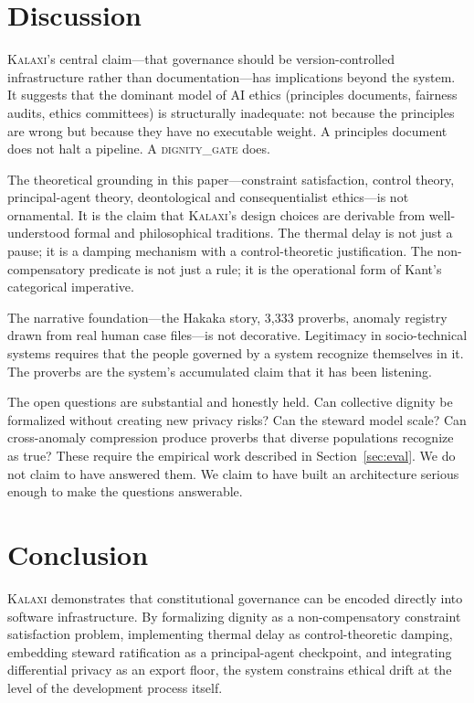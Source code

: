 \documentclass[12pt,a4paper]{article}
\theoremstyle{definition}
\theoremstyle{remark}
\newcommand{\dignitygate}{\textsc{dignity\_gate}}
\newcommand{\kalaxi}{\textsc{Kalaxi}}
\begin{document}
\section{Discussion}
\label{sec:discussion}

\kalaxi{}'s central claim—that governance should be version-controlled infrastructure
rather than documentation—has implications beyond the system. It suggests that the
dominant model of AI ethics (principles documents, fairness audits, ethics committees)
is structurally inadequate: not because the principles are wrong but because they
have no executable weight. A principles document does not halt a pipeline. A
\dignitygate{} does.

The theoretical grounding in this paper—constraint satisfaction, control theory,
principal-agent theory, deontological and consequentialist ethics—is not ornamental.
It is the claim that \kalaxi{}'s design choices are derivable from well-understood
formal and philosophical traditions. The thermal delay is not just a pause; it is a
damping mechanism with a control-theoretic justification. The non-compensatory
predicate is not just a rule; it is the operational form of Kant's categorical
imperative.

The narrative foundation—the Hakaka story, 3{,}333 proverbs, anomaly registry drawn
from real human case files—is not decorative. Legitimacy in socio-technical systems
\cite{trist1981} requires that the people governed by a system recognize themselves
in it. The proverbs are the system's accumulated claim that it has been listening.

The open questions are substantial and honestly held. Can collective dignity be
formalized without creating new privacy risks? Can the steward model scale? Can
cross-anomaly compression produce proverbs that diverse populations recognize as true?
These require the empirical work described in Section~\ref{sec:eval}. We do not claim
to have answered them. We claim to have built an architecture serious enough to make
the questions answerable.

\section{Conclusion}
\label{sec:conclusion}

\kalaxi{} demonstrates that constitutional governance can be encoded directly into
software infrastructure. By formalizing dignity as a non-compensatory constraint
satisfaction problem, implementing thermal delay as control-theoretic damping,
embedding steward ratification as a principal-agent checkpoint, and integrating
differential privacy as an export floor, the system constrains ethical drift at the
level of the development process itself.
\end{document}
